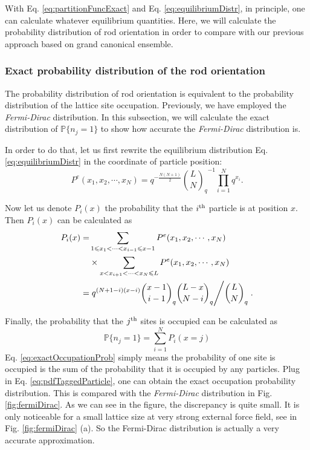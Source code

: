 With Eq. \eqref{eq:partitionFuncExact} and Eq. \eqref{eq:equilibriumDistr}, in principle, one can calculate whatever equilibrium quantities. Here, we will calculate the probability distribution of rod orientation in order to compare with our previous approach based on grand canonical ensemble. 

\subsubsection{Exact probability distribution of the rod orientation}
\label{ssub:Exact probability distribution of the rod orientation}
The probability distribution of rod orientation is equivalent to the probability distribution of the lattice site occupation. Previously, we have employed the \emph{Fermi-Dirac} distribution. In this subsection, we will calculate the exact distribution of $\mathbb{P}\{n_j=1\}$ to show how accurate the \emph{Fermi-Dirac} distribution is. 

In order to do that, let us first rewrite the equilibrium distribution Eq. \eqref{eq:equilibriumDistr} in the coordinate of particle position:
\begin{equation}
    \label{eq:equilibriumDistrPos}
    P^e(x_1, x_2, \cdots, x_N) = q^{-\frac{N(N+1)}{2}} {\binom{L}{N}_q}^{-1}\prod_{i=1}^N q^{x_i}.
\end{equation}

Now let us denote $P_i(x)$ the probability that the $i^{\rm{th}}$ particle is at position $x$. Then $P_i(x)$ can be calculated as 
\begin{equation}
    \begin{aligned}
        \label{eq:pdfTaggedParticle}
        P_i(x) = & \sum_{1 \leqslant x_1<\cdots<x_{i-1}\leqslant x-1}P^e(x_1, x_2, \cdots, x_N) \\
        &\times \sum_{x<x_{i+1}<\cdots<x_{N}\leqslant L}P^e(x_1, x_2, \cdots, x_N) \\
        = & \left. q^{(N+1-i)(x-i)} \binom{x-1}{i-1}_q\binom{L-x}{N-i}_q 
            \middle/  \binom{L}{N}_q \right..
    \end{aligned}
\end{equation}

Finally, the probability that the $j^{\rm{th}}$ sites is occupied can be calculated as
\begin{equation}
    \label{eq:exactOccupationProb}
    \mathbb{P}\{n_j=1\} = \sum_{i=1}^N P_i(x=j) 
\end{equation}
Eq. \eqref{eq:exactOccupationProb} simply means the probability of one site is occupied is the sum of the probability that it is occupied by any particles. Plug in Eq. \eqref{eq:pdfTaggedParticle}, one can obtain the exact occupation probability distribution. This is compared with the \emph{Fermi-Dirac} distribution in Fig. \ref{fig:fermiDirac}. As we can see in the figure, the discrepancy is quite small. It is only noticeable for a small lattice size at very strong external force field, see in Fig. \ref{fig:fermiDirac} (a). So the Fermi-Dirac distribution is actually a very accurate approximation. 


